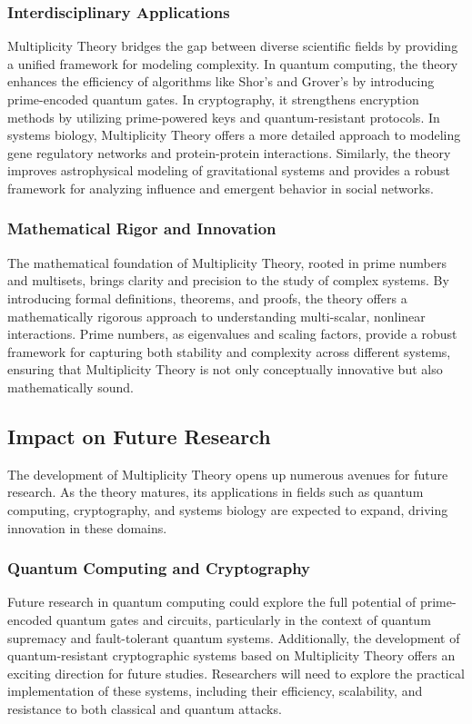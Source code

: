\documentclass[%
 preprint, linenumbers,
 amsmath,amssymb,
 aps, physrev,
]{revtex4-2}
\begin{document}
\subsubsection{Interdisciplinary Applications}
Multiplicity Theory bridges the gap between diverse scientific fields by providing a unified framework for modeling complexity. In quantum computing, the theory enhances the efficiency of algorithms like Shor’s and Grover’s by introducing prime-encoded quantum gates. In cryptography, it strengthens encryption methods by utilizing prime-powered keys and quantum-resistant protocols. In systems biology, Multiplicity Theory offers a more detailed approach to modeling gene regulatory networks and protein-protein interactions. Similarly, the theory improves astrophysical modeling of gravitational systems and provides a robust framework for analyzing influence and emergent behavior in social networks.

\subsubsection{Mathematical Rigor and Innovation}
The mathematical foundation of Multiplicity Theory, rooted in prime numbers and multisets, brings clarity and precision to the study of complex systems. By introducing formal definitions, theorems, and proofs, the theory offers a mathematically rigorous approach to understanding multi-scalar, nonlinear interactions. Prime numbers, as eigenvalues and scaling factors, provide a robust framework for capturing both stability and complexity across different systems, ensuring that Multiplicity Theory is not only conceptually innovative but also mathematically sound.

\subsection{Impact on Future Research}
The development of Multiplicity Theory opens up numerous avenues for future research. As the theory matures, its applications in fields such as quantum computing, cryptography, and systems biology are expected to expand, driving innovation in these domains.

\subsubsection{Quantum Computing and Cryptography}
Future research in quantum computing could explore the full potential of prime-encoded quantum gates and circuits, particularly in the context of quantum supremacy and fault-tolerant quantum systems. Additionally, the development of quantum-resistant cryptographic systems based on Multiplicity Theory offers an exciting direction for future studies. Researchers will need to explore the practical implementation of these systems, including their efficiency, scalability, and resistance to both classical and quantum attacks.
\end{document}
